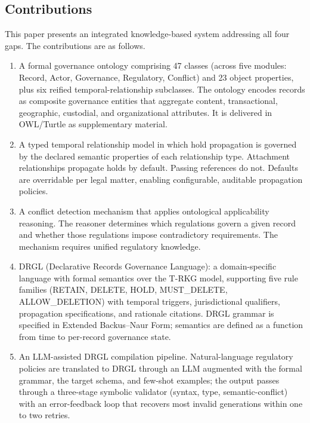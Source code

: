 \documentclass{ieeeaccess}
\begin{document}
\subsection{Contributions}

This paper presents an integrated knowledge-based system addressing all four gaps. The contributions are as follows.

\begin{enumerate}
    \item A formal governance ontology comprising 47 classes (across five modules: Record, Actor, Governance, Regulatory, Conflict) and 23 object properties, plus six reified temporal-relationship subclasses. The ontology encodes records as composite governance entities that aggregate content, transactional, geographic, custodial, and organizational attributes. It is delivered in OWL/Turtle as supplementary material.
    \item A typed temporal relationship model in which hold propagation is governed by the declared semantic properties of each relationship type. Attachment relationships propagate holds by default. Passing references do not. Defaults are overridable per legal matter, enabling configurable, auditable propagation policies.
    \item A conflict detection mechanism that applies ontological applicability reasoning. The reasoner determines which regulations govern a given record and whether those regulations impose contradictory requirements. The mechanism requires unified regulatory knowledge.
    \item DRGL (Declarative Records Governance Language): a domain-specific language with formal semantics over the T-RKG model, supporting five rule families (RETAIN, DELETE, HOLD, MUST\_DELETE, ALLOW\_DELETION) with temporal triggers, jurisdictional qualifiers, propagation specifications, and rationale citations. DRGL grammar is specified in Extended Backus--Naur Form; semantics are defined as a function from time to per-record governance state.
    \item An LLM-assisted DRGL compilation pipeline. Natural-language regulatory policies are translated to DRGL through an LLM augmented with the formal grammar, the target schema, and few-shot examples; the output passes through a three-stage symbolic validator (syntax, type, semantic-conflict) with an error-feedback loop that recovers most invalid generations within one to two retries.

\end{enumerate}
\end{document}
